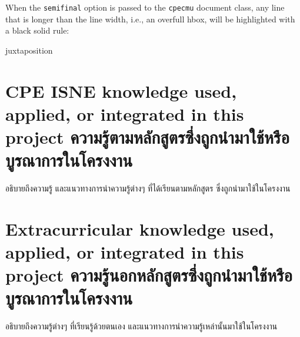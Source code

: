 When the \verb.semifinal. option is passed to the \verb.cpecmu. document class,
any line that is longer than the line width, i.e., an overfull hbox, will be
highlighted with a black solid rule:
\begin{center}
\begin{minipage}{2em}
juxtaposition
\end{minipage}
\end{center}

\section{\ifenglish%
\ifcpe CPE \else ISNE \fi knowledge used, applied, or integrated in this project
\else%
ความรู้ตามหลักสูตรซึ่งถูกนำมาใช้หรือบูรณาการในโครงงาน
\fi
}

อธิบายถึงความรู้ และแนวทางการนำความรู้ต่างๆ ที่ได้เรียนตามหลักสูตร ซึ่งถูกนำมาใช้ในโครงงาน

\section{\ifenglish%
Extracurricular knowledge used, applied, or integrated in this project
\else%
ความรู้นอกหลักสูตรซึ่งถูกนำมาใช้หรือบูรณาการในโครงงาน
\fi
}

อธิบายถึงความรู้ต่างๆ ที่เรียนรู้ด้วยตนเอง และแนวทางการนำความรู้เหล่านั้นมาใช้ในโครงงาน
